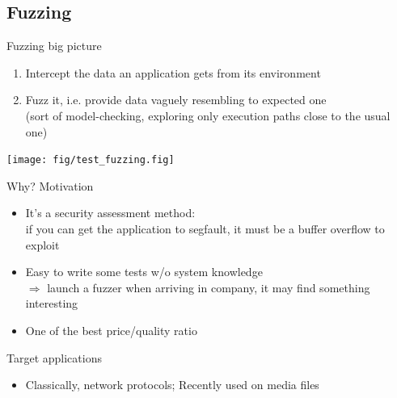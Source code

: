 \subsection{Fuzzing}\subsectionpage
\begin{frame}[squeeze]{Fuzzing big picture}
  \begin{enumerate}
  \item Intercept the data an application gets from its environment
  \item \alert{Fuzz it}, i.e. provide data vaguely resembling to expected
    one\\ 
    {\small (sort of model-checking, exploring only execution paths close to
      the usual one)}
  \end{enumerate}

  \centerline{\texttt{[image: fig/test\_fuzzing.fig]}}

  \begin{block}{Why? Motivation}\vspace{-.2\baselineskip}
    \begin{itemize}
    \item It's a security assessment method:\\
      {\small if you can get the application to segfault, it must be a buffer overflow
      to exploit}
    \item Easy to write some tests w/o system knowledge\\
      {\small $\Rightarrow$ launch a fuzzer when arriving in company, it may
        find something interesting}
    \item One of the best price/quality ratio
    \end{itemize}
  \end{block}\vspace{-.4\baselineskip}

  \begin{block}{Target applications}\vspace{-.2\baselineskip}
    \begin{itemize}
    \item Classically, network protocols; Recently used on media files
    \end{itemize}
  \end{block}
\end{frame}
